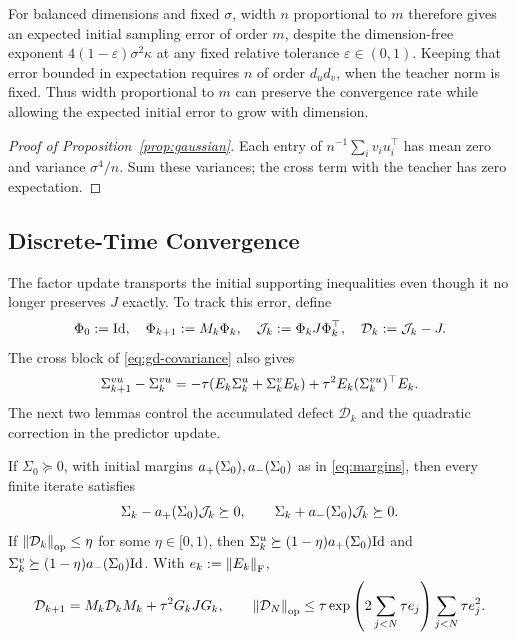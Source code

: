 For balanced dimensions and fixed $\sigma$, width $n$ proportional to $m$
therefore gives an expected initial sampling error of order $m$, despite
the dimension-free exponent $4(1-\varepsilon)\sigma^2\kappa$ at any
fixed relative tolerance $\varepsilon\in(0,1)$. Keeping that error bounded
in expectation requires $n$ of order $d_ud_v$, when the teacher norm is
fixed. Thus width proportional to $m$ can preserve the convergence rate
while allowing the expected initial error to grow with dimension.

\begin{proof}[Proof of Proposition~\ref{prop:gaussian}]
Each entry of $n^{-1}\sum_i v_i u_i^\top$ has mean zero and variance
$\sigma^4/n$. Sum these variances; the cross term with the teacher has
zero expectation.
\end{proof}

\subsection{Discrete-Time Convergence}\label{app:gd}
The factor update transports the initial supporting inequalities even
though it no longer preserves $J$ exactly. To track this error, define
\begin{equation}\label{eq:gd-signature}
\Phi_0:=\mathrm{Id},\quad\Phi_{k+1}:=M_k\Phi_k,\quad
\mathcal J_k:=\Phi_kJ\Phi_k^\top,\quad\mathcal D_k:=\mathcal J_k-J.
\end{equation}
The cross block of \eqref{eq:gd-covariance} also gives
\begin{equation}\label{eq:gd-predictor-update}
 \Sigma^{vu}_{k+1}-\Sigma^{vu}_k
 =-\tau(E_k\Sigma^u_k+\Sigma^v_kE_k)+\tau^2E_k(\Sigma^{vu}_k)^\top E_k.
\end{equation}
The next two lemmas control the accumulated defect $\mathcal D_k$ and
the quadratic correction in the predictor update.

\begin{lemma}\label{lem:gd-support}
If $\Sigma_0\succeq0$, with initial margins $a_+(\Sigma_0),a_-(\Sigma_0)$ as in
\eqref{eq:margins}, then every finite iterate satisfies
\[
 \Sigma_k-a_+(\Sigma_0)\mathcal J_k\succeq0,\qquad
 \Sigma_k+a_-(\Sigma_0)\mathcal J_k\succeq0.
\]
If $\left\lVert \mathcal D_k \right\rVert_{\mathrm{op}}\le\eta$ for some $\eta\in[0,1)$, then
$\Sigma^u_k\succeq(1-\eta)a_+(\Sigma_0)\mathrm{Id}$ and
$\Sigma^v_k\succeq(1-\eta)a_-(\Sigma_0)\mathrm{Id}$. With $e_k:=\left\lVert E_k \right\rVert_{\mathrm{F}}$,
\begin{equation}\label{eq:gd-defect-recursion}
 \mathcal D_{k+1}=M_k\mathcal D_kM_k+\tau^2G_kJG_k,\qquad
 \left\lVert \mathcal D_N \right\rVert_{\mathrm{op}}
 \le\tau\exp\left(2\sum_{j<N}\tau e_j\right)
             \sum_{j<N}\tau e_j^2.
\end{equation}
\end{lemma}

